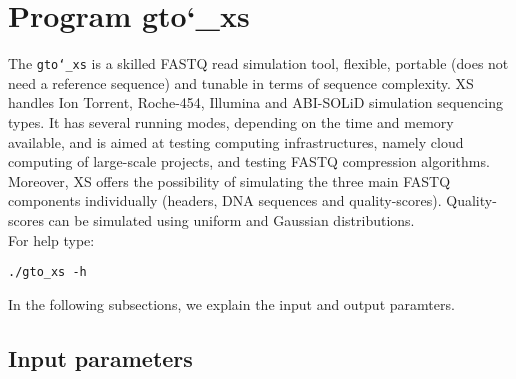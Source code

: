 \section{Program gto\char`_xs}
The \texttt{gto\char`_xs} is a skilled FASTQ read simulation tool, flexible, portable (does not need a reference sequence) and tunable in terms of sequence complexity. XS handles Ion Torrent, Roche-454, Illumina and ABI-SOLiD simulation sequencing types. It has several running modes, depending on the time and memory available, and is aimed at testing computing infrastructures, namely cloud computing of large-scale projects, and testing FASTQ compression algorithms. Moreover, XS offers the possibility of simulating the three main FASTQ components individually (headers, DNA sequences and quality-scores). Quality-scores can be simulated using uniform and Gaussian distributions.\\
For help type:
\begin{lstlisting}
./gto_xs -h
\end{lstlisting}
In the following subsections, we explain the input and output paramters.

\subsection*{Input parameters}

